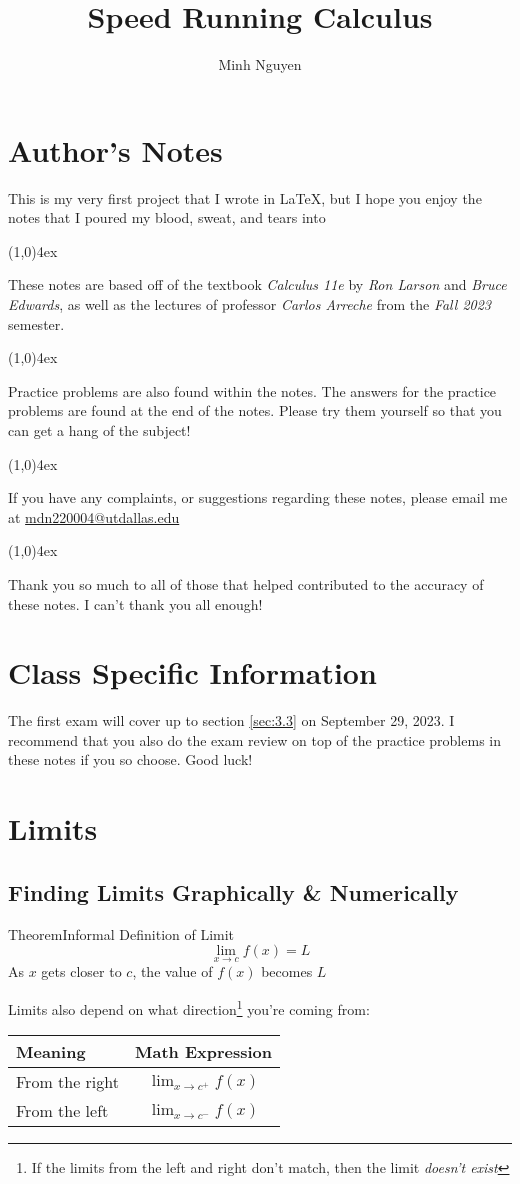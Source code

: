\documentclass{MathNotes}
\title{Speed Running Calculus}
\author{Minh Nguyen}
\newenvironment{theorem}[1]{\begin{GrayBox}{Theorem}{#1}}{\end{GrayBox}}
\newcommand{\br}{
\begin{center}
\line(1,0){4ex}
\end{center}}
\begin{document}
\newpage
\maketitle
{}
\tableofcontents
\newpage
\section*{Author's Notes}
This is my very first project that I wrote in \LaTeX, but I hope you enjoy
the notes that I poured my blood, sweat, and tears into  
\br
These notes are based off of the textbook \textit{Calculus 11e} by 
\textit{Ron Larson} and \textit{Bruce Edwards}, as well as the lectures of 
professor \textit{Carlos Arreche} from the \textit{Fall 2023} semester.
\br
Practice problems are also found within the notes. The answers for the practice
problems are found at the end of the notes. Please try them yourself so that
you can get a hang of the subject!
\br
If you have any complaints, or suggestions regarding these notes, please
email me at \newline\href{mailto:minh.nguyen7@utdallas.edu}{mdn220004@utdallas.edu}
\br
Thank you so much to all of those that helped contributed to the accuracy of
these notes. I can't thank you all enough!

\section*{Class Specific Information}
The first exam will cover up to section \ref{sec:3.3} on September 29, 2023.
I recommend that you also do the exam review on top of the practice problems
in these notes if you so choose. Good luck!
\newpage
{}

\section{Limits}\label{sec:1}
\subsection{Finding Limits Graphically \& Numerically}

\begin{multicols}{2}[]
\begin{theorem}{Informal Definition of Limit}
    \[\lim_{x\to c}f(x)=L\] 
    As $x$ gets closer to $c$, the value of $f(x)$ becomes $L$
\end{theorem}


Limits also depend on what direction\footnote{If the limits from the left and
right don't match, then the limit \textit{doesn't exist}} you're coming from:
\begin{tabular}{ |l|c| }
    \hline
    Meaning & Math Expression\\
    \hline
    \hline
    From the right & $\lim_{x\to c^+}f(x)$ \\
    \hline
    From the left & $\lim_{x\to c^-}f(x)$ \\
    \hline
\end{tabular}
\end{multicols}
\end{document}
